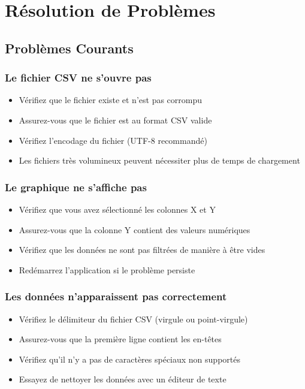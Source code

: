 \documentclass[11pt, a4paper]{article}
\begin{document}
\section{Résolution de Problèmes}

\subsection{Problèmes Courants}

\subsubsection{Le fichier CSV ne s'ouvre pas}
\begin{itemize}
    \item Vérifiez que le fichier existe et n'est pas corrompu
    \item Assurez-vous que le fichier est au format CSV valide
    \item Vérifiez l'encodage du fichier (UTF-8 recommandé)
    \item Les fichiers très volumineux peuvent nécessiter plus de temps de chargement
\end{itemize}

\subsubsection{Le graphique ne s'affiche pas}
\begin{itemize}
    \item Vérifiez que vous avez sélectionné les colonnes X et Y
    \item Assurez-vous que la colonne Y contient des valeurs numériques
    \item Vérifiez que les données ne sont pas filtrées de manière à être vides
    \item Redémarrez l'application si le problème persiste
\end{itemize}

\subsubsection{Les données n'apparaissent pas correctement}
\begin{itemize}
    \item Vérifiez le délimiteur du fichier CSV (virgule ou point-virgule)
    \item Assurez-vous que la première ligne contient les en-têtes
    \item Vérifiez qu'il n'y a pas de caractères spéciaux non supportés
    \item Essayez de nettoyer les données avec un éditeur de texte
\end{itemize}
\end{document}
